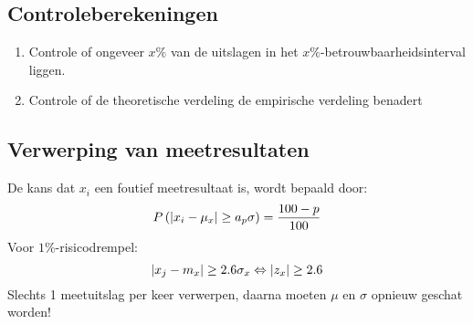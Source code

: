   \subsection{Controleberekeningen}
  \label{sec:Controleberekeningen}
    \begin{enumerate}
	    \item Controle of ongeveer $x\%$ van de uitslagen in het $x\%$-betrouwbaarheidsinterval liggen.
	    \item Controle of de theoretische verdeling de empirische verdeling benadert
    \end{enumerate}
    
  \subsection{Verwerping van meetresultaten}
  \label{sec:VerwerpingMeetresultaten}
    De kans dat $x_i$ een foutief meetresultaat is, wordt bepaald door:
    \[
      P\left(\left| x_i-\mu_x \right| \ge a_p \sigma\right) = \frac{100 - p}{100}
    \]
    Voor $1\%$-risicodrempel:
    \[
      \left| x_j - m_x \right| \ge 2.6 \sigma_x \Leftrightarrow \left| z_x \right| \ge 2.6
    \]
    Slechts 1 meetuitslag per keer verwerpen, daarna moeten $\mu$ en $\sigma$ opnieuw geschat worden!
    
    
